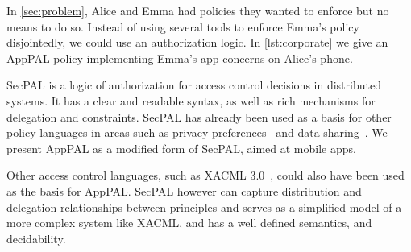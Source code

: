 \documentclass[]{llncs}
\begin{document}
In \autoref{sec:problem}, Alice and Emma had policies they wanted to enforce but no means to do so.
Instead of using several tools to enforce Emma's policy disjointedly, we could use an authorization logic.
In \autoref{lst:corporate} we give an AppPAL policy implementing Emma's app concerns on Alice's phone.

SecPAL is a logic of authorization for access control decisions in distributed systems.
It has a clear and readable syntax, as well as rich mechanisms for delegation and constraints.
SecPAL has already been used as a basis for other policy languages in areas such as privacy preferences~\cite{Becker:2009ula} and data-sharing~\cite{Aziz:2011vt}.
We present AppPAL as a modified form of SecPAL, aimed at mobile apps.

Other access control languages, such as XACML 3.0~\cite{Oasis:1M71_oFS}, could also have been used as the basis for AppPAL.
SecPAL however can capture distribution and delegation relationships between
principles and serves as a simplified model of a more complex system like XACML,
and has a well defined semantics, and decidability.
\end{document}

